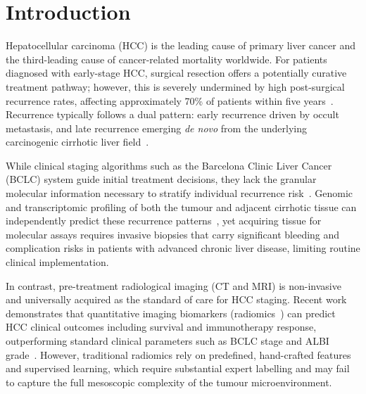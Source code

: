 \documentclass[12pt,twoside]{report}
\date{June 2026}
\begin{document}
\raggedbottom



\clearpage{\pagestyle{empty}\cleardoublepage}
\setcounter{page}{1}
\pagestyle{fancy}

\tableofcontents

\clearpage
{}
\setcounter{page}{1}
\fancyhead[LE,RO]{\slshape \rightmark}
\fancyhead[LO,RE]{\slshape \leftmark}

\chapter{Introduction}

Hepatocellular carcinoma (HCC) is the leading cause of primary liver cancer and the
third-leading cause of cancer-related mortality worldwide.
For patients diagnosed with early-stage HCC, surgical resection offers a potentially curative treatment pathway;
however, this is severely undermined by high post-surgical recurrence rates,
affecting approximately 70\% of patients within five years~\cite{reig2022bclc,villanueva2011combining}.
Recurrence typically follows a dual pattern: early recurrence driven by occult metastasis,
and late recurrence emerging \textit{de novo} from the underlying carcinogenic cirrhotic liver field~\cite{villanueva2011combining}.

While clinical staging algorithms such as the Barcelona Clinic Liver Cancer (BCLC) system guide initial treatment decisions,
they lack the granular molecular information necessary to stratify individual recurrence risk~\cite{reig2022bclc}.
Genomic and transcriptomic profiling of both the tumour and adjacent cirrhotic tissue can independently predict
these recurrence patterns~\cite{villanueva2011combining}, yet acquiring tissue for molecular assays
requires invasive biopsies that carry significant bleeding and complication risks in patients with advanced chronic liver disease,
limiting routine clinical implementation.

In contrast, pre-treatment radiological imaging (CT and MRI) is non-invasive and universally acquired
as the standard of care for HCC staging.
Recent work demonstrates that quantitative imaging biomarkers (radiomics~\cite{lambin2012radiomics})
can predict HCC clinical outcomes including survival and immunotherapy response,
outperforming standard clinical parameters such as BCLC stage and ALBI grade~\cite{vithayathil2025machine}.
However, traditional radiomics rely on predefined, hand-crafted features and supervised learning,
which require substantial expert labelling and may fail to capture the full mesoscopic complexity of
the tumour microenvironment.
\end{document}
